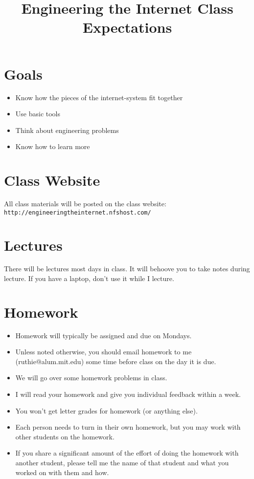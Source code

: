 \documentclass{article}
\title{Engineering the Internet Class Expectations}
\begin{document}
\maketitle

\section{Goals}
\begin{itemize}
\item Know how the pieces of the internet-system fit together
\item Use basic tools
\item Think about engineering problems
\item Know how to learn more
\end{itemize}

\section{Class Website}
All class materials will be posted on the class website:\\ 
\texttt{http://engineeringtheinternet.nfshost.com/}

\section{Lectures}
There will be lectures most days in class.  It will behoove you to take notes during lecture.  If you have a laptop, don't use it while I lecture.

\section{Homework}

\begin{itemize}
\item Homework will typically be assigned and due on Mondays.
\item Unless noted otherwise, you should email homework to me (ruthie@alum.mit.edu) some time before class on the day it is due.
\item We will go over some homework problems in class.
\item I will read your homework and give you individual feedback within a week.
\item You won't get letter grades for homework (or anything else).
\item Each person needs to turn in their own homework, but you may work with other students on the homework.
\item If you share a significant amount of the effort of doing the homework with another student, please tell me the name of that student and what you worked on with them and how.
\end{itemize}
\end{document}
